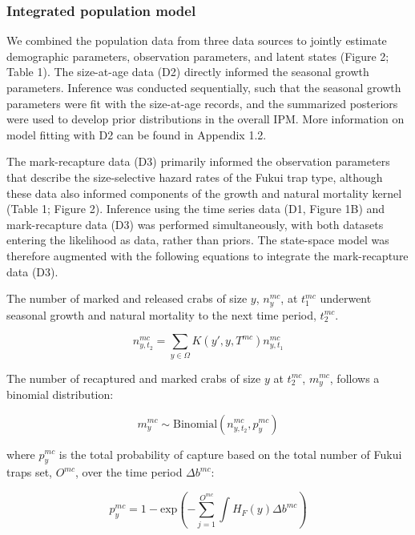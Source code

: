 \documentclass{article}
\begin{document}
\subsubsection*{Integrated population model}

We combined the population data from three data sources to jointly estimate demographic parameters, observation parameters, and latent states (Figure 2; Table 1). The size-at-age data (D2) directly informed the seasonal growth parameters. Inference was conducted sequentially, such that the seasonal growth parameters were fit with the size-at-age records, and the summarized posteriors were used to develop prior distributions in the overall IPM. More information on model fitting with D2 can be found in Appendix 1.2. 

The mark-recapture data (D3) primarily informed the observation parameters that describe the size-selective hazard rates of the Fukui trap type, although these data also informed components of the growth and natural mortality kernel (Table 1; Figure 2). Inference using the time series data (D1, Figure 1B) and mark-recapture data (D3) was performed simultaneously, with both datasets entering the likelihood as data, rather than priors. The state-space model was therefore augmented with the following equations to integrate the mark-recapture data (D3).

The number of marked and released crabs of size $y$, $n_y^{mc}$, at $t_1^{mc}$ underwent seasonal growth and natural mortality to the next time period, $t_2^{mc}$.

\begin{equation}
n_{y,t_2}^{mc} = \sum_{y \in \Omega} K(y',y, T^{mc}) n_{y,t_1}^{mc} 
\end{equation}

The number of recaptured and marked crabs of size $y$ at $t_2^{mc}$, $m_{y}^{mc}$, follows a binomial distribution:

\begin{equation}
m_{y}^{mc} \sim \text{Binomial}(n_{y,t_2}^{mc}, p_y^{mc}) 
\end{equation}

where $p_y^{mc}$ is the total probability of capture based on the total number of Fukui traps set, $O^{mc}$, over the time period $\Delta b^{mc}$:

\begin{equation}
p_y^{mc} = 1-\text{exp}\left(-\sum_{j=1}^{O^{mc}}\int H_F(y)\Delta b^{mc}\right)
\end{equation}
\end{document}
